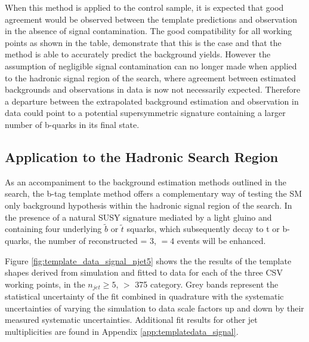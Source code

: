 When this method is applied to the \mupjets control sample, it is expected that good agreement would be observed between the template predictions and observation in the absence of signal contamination. The good compatibility for all working points as shown in the table, demonstrate that this is the case and that the method is able to accurately predict the background yields. However the assumption of negligible signal contamination can no longer made when applied to the hadronic signal region of the \alphat search, where agreement between estimated backgrounds and observations in data is now not necessarily expected. Therefore a departure between the extrapolated background estimation and observation in data could point to a potential supersymmetric signature containing a larger number of b-quarks in its final state.
 
\subsection{Application to the \alphat Hadronic Search Region}
\label{subsec:templatedataresults}

As an accompaniment to the background estimation methods outlined in the \alphat search, the b-tag template method offers a complementary way of testing the \ac{SM} only background hypothesis within the hadronic signal region of the search. In the presence of a natural \ac{SUSY} signature mediated by a light gluino and containing four underlying $\widetilde{b}$ or $\widetilde{t}$ squarks, which subsequently decay to t or b-quarks, the number of reconstructed \nbreco = 3, $= 4$ events will be enhanced.

Figure \ref{fig:template_data_signal_njet5} shows the  the results of the template shapes derived from simulation and fitted to data for each of the three \ac{CSV} working points, in the $n_{jet} \geq 5$, \theht $>$ 375 \GeV category.  Grey bands represent the statistical uncertainty of the fit combined in quadrature with the systematic uncertainties of varying the simulation to data scale factors up and down by their measured systematic uncertainties.  Additional fit results for other jet multiplicities are found in Appendix \ref{app:templatedata_signal}.

\vspace*{100px}

